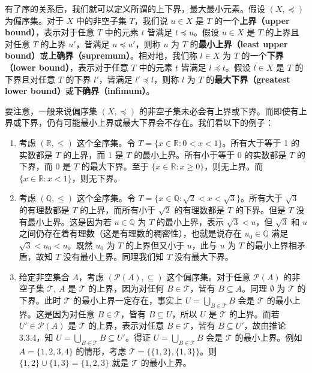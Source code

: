 有了序的关系后，我们就可以定义所谓的上下界，最大最小元素。假设 $(X, \preceq)$ 为偏序集。对于 $X$ 中的非空子集 $T$，我们说 $u \in X$ 是 $T$ 的一个\textbf{上界（upper bound）}，表示对于任意 $T$ 中的元素 $t$ 皆满足 $t \preceq u$。假设 $u \in X$ 是 $T$ 的上界且对任意 $T$ 的上界 $u'$，皆满足 $u \preceq u'$，则称 $u$ 为 $T$ 的\textbf{最小上界（least upper bound）}或\textbf{上确界（supremum）}。相对地，我们称 $l \in X$ 为 $T$ 的一个\textbf{下界（lower bound）}，表示对于任意 $T$ 中的元素 $t$ 皆满足 $l \preceq t$。假设 $l \in X$ 是 $T$ 的下界且对任意 $T$ 的下界 $l'$，皆满足 $l' \preceq l$，则称 $l$ 为 $T$ 的\textbf{最大下界（greatest lower bound）}或\textbf{下确界（infimum）}。

要注意，一般来说偏序集 $(X, \preceq)$ 的非空子集未必会有上界或下界。而即使有上界或下界，仍有可能最小上界或最大下界会不存在。我们看以下的例子：

\begin{example}
\begin{enumerate}
    \item 考虑 $(\mathbb{R}, \leq)$ 这个全序集。令 $T = \{x \in \mathbb{R} : 0 < x < 1\}$。所有大于等于 1 的实数都是 $T$ 的上界，而 1 是 $T$ 的最小上界。所有小于等于 0 的实数都是 $T$ 的下界，而 0 是 $T$ 的最大下界。至于 $\{x \in \mathbb{R} : x \geq 0\}$，则无上界。而 $\{x \in \mathbb{R} : x < 1\}$，则无下界。
    \item 考虑 $(\mathbb{Q}, \leq)$ 这个全序集。令 $T = \{x \in \mathbb{Q} : \sqrt{2} < x < \sqrt{3}\}$。所有大于 $\sqrt{3}$ 的有理数都是 $T$ 的上界，而所有小于 $\sqrt{2}$ 的有理数都是 $T$ 的下界。但是 $T$ 没有最小上界。这是因为若 $u \in \mathbb{Q}$ 为 $T$ 的最小上界，表示 $\sqrt{3} < u$，但 $\sqrt{3}$ 和 $u$ 之间仍存在着有理数（这是有理数的稠密性），也就是说存在 $u_0 \in \mathbb{Q}$ 满足 $\sqrt{3} < u_0 < u$。既然 $u_0$ 为 $T$ 的上界但又小于 $u$，此与 $u$ 为 $T$ 的最小上界相矛盾，故知 $T$ 没有最小上界。同理我们知 $T$ 没有最大下界。
    \item 给定非空集合 $A$，考虑 $(\mathcal{P}(A), \subseteq)$ 这个偏序集。对于任意 $\mathcal{P}(A)$ 的非空子集 $\mathcal{T}$, $A$ 是 $\mathcal{T}$ 的上界，因为对任何 $B \in \mathcal{T}$，皆有 $B \subseteq A$。同理 $\emptyset$ 为 $\mathcal{T}$ 的下界。此时 $\mathcal{T}$ 的最小上界一定存在，事实上 $U = \bigcup_{B \in \mathcal{T}} B$ 会是 $\mathcal{T}$ 的最小上界。这是因为对任意 $B \in \mathcal{T}$，皆有 $B \subseteq U$，所以 $U$ 是 $\mathcal{T}$ 的上界。而若 $U' \in \mathcal{P}(A)$ 是 $\mathcal{T}$ 的上界，表示对任意 $B \in \mathcal{T}$，皆有 $B \subseteq U'$，故由推论 3.3.4，知 $U = \bigcup_{B \in \mathcal{T}} B \subseteq U'$。得证 $U = \bigcup_{B \in \mathcal{T}} B$ 会是 $\mathcal{T}$ 的最小上界。例如 $A = \{1, 2, 3, 4\}$ 的情形，考虑 $\mathcal{T} = \{\{1, 2\}, \{1, 3\}\}$。则 $\{1, 2\} \cup \{1, 3\} = \{1, 2, 3\}$ 就是 $\mathcal{T}$ 的最小上界。
\end{enumerate}
\end{example}

